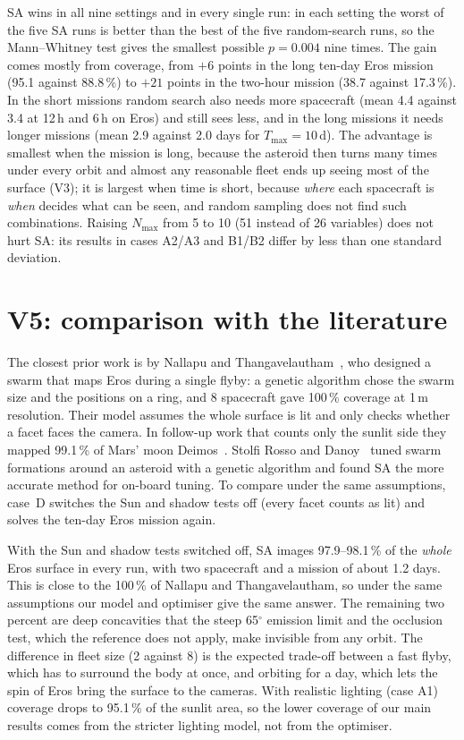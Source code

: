 \ac{SA} wins in all nine settings and in every single run: in each setting the worst of the five
\ac{SA} runs is better than the best of the five random-search runs, so the Mann--Whitney test gives
the smallest possible $p=0.004$ nine times. The gain comes mostly from coverage, from $+6$ points in
the long ten-day Eros mission (95.1 against 88.8\,\%) to $+21$ points in the two-hour mission (38.7
against 17.3\,\%). In the short missions random search also needs more spacecraft (mean 4.4 against
3.4 at 12\,h and 6\,h on Eros) and still sees less, and in the long missions it needs longer missions
(mean 2.9 against 2.0 days for $T_{\max}=10$\,d). The advantage is smallest when the mission is long,
because the asteroid then turns many times under every orbit and almost any reasonable fleet ends
up seeing most of the surface (V3); it is largest when time is short, because \emph{where} each
spacecraft is \emph{when} decides what can be seen, and random sampling does not find such
combinations. Raising $N_{\max}$ from 5 to 10 (51 instead of 26 variables) does not hurt \ac{SA}: its
results in cases A2/A3 and B1/B2 differ by less than one standard deviation.

\section{V5: comparison with the literature}
\label{sec:v5}
The closest prior work is by Nallapu and Thangavelautham~\cite{nallapu2019}, who designed a swarm
that maps Eros during a single flyby: a genetic algorithm chose the swarm size and the positions on
a ring, and 8 spacecraft gave 100\,\% coverage at 1\,m resolution. Their model assumes the whole
surface is lit and only checks whether a facet faces the camera. In follow-up work that counts only
the sunlit side they mapped 99.1\,\% of Mars' moon Deimos~\cite{nallapu2021}. Stolfi Rosso and
Danoy~\cite{stolfi2023} tuned swarm formations around an asteroid with a genetic algorithm and found
\ac{SA} the more accurate method for on-board tuning. To compare under the same assumptions, case~D
switches the Sun and shadow tests off (every facet counts as lit) and solves the ten-day Eros mission
again.



With the Sun and shadow tests switched off, \ac{SA} images 97.9--98.1\,\% of the \emph{whole} Eros
surface in every run, with two spacecraft and a mission of about 1.2 days. This is close to the
100\,\% of Nallapu and Thangavelautham, so under the same assumptions our model and optimiser give
the same answer. The remaining two percent are deep concavities that the steep 65$^\circ$ emission
limit and the occlusion test, which the reference does not apply, make invisible from any orbit.
The difference in fleet size (2 against 8) is the expected trade-off between a fast flyby, which has
to surround the body at once, and orbiting for a day, which lets the spin of Eros bring the surface to
the cameras. With realistic lighting (case A1) coverage drops to 95.1\,\% of the sunlit area, so the
lower coverage of our main results comes from the stricter lighting model, not from the optimiser.

